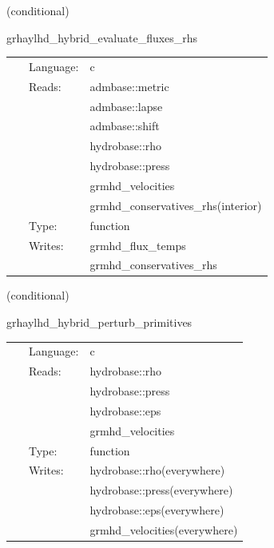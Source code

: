 \documentclass{article}
\begin{document}
\vspace{5mm}

   (conditional) 

\hspace{5mm} grhaylhd\_hybrid\_evaluate\_fluxes\_rhs 

\hspace{5mm}{\it hybrid version of grhaylhd\_evaluate\_fluxes\_rhs } 


\hspace{5mm}

 \begin{tabular*}{160mm}{cll} 
~ & Language:  & c \\ 
~ & Reads:  & admbase::metric \\ 
~& ~ &admbase::lapse\\ 
~& ~ &admbase::shift\\ 
~& ~ &hydrobase::rho\\ 
~& ~ &hydrobase::press\\ 
~& ~ &grmhd\_velocities\\ 
~& ~ &grmhd\_conservatives\_rhs(interior)\\ 
~ & Type:  & function \\ 
~ & Writes:  & grmhd\_flux\_temps \\ 
~& ~ &grmhd\_conservatives\_rhs\\ 
\end{tabular*} 


\vspace{5mm}

   (conditional) 

\hspace{5mm} grhaylhd\_hybrid\_perturb\_primitives 

\hspace{5mm}{\it hybrid version of grhaylhd\_perturb\_primitives } 


\hspace{5mm}

 \begin{tabular*}{160mm}{cll} 
~ & Language:  & c \\ 
~ & Reads:  & hydrobase::rho \\ 
~& ~ &hydrobase::press\\ 
~& ~ &hydrobase::eps\\ 
~& ~ &grmhd\_velocities\\ 
~ & Type:  & function \\ 
~ & Writes:  & hydrobase::rho(everywhere) \\ 
~& ~ &hydrobase::press(everywhere)\\ 
~& ~ &hydrobase::eps(everywhere)\\ 
~& ~ &grmhd\_velocities(everywhere)\\ 
\end{tabular*} 
\end{document}

